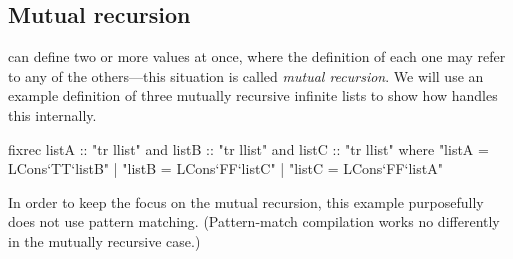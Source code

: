 \subsection{Mutual recursion}
\label{sec:fixrec-impl-mutual}

{\fixrec} can define two or more values at once, where the definition of each one may refer to any of the others---this situation is called \emph{mutual recursion}. We will use an example definition of three mutually recursive infinite lists to show how {\fixrec} handles this internally.
%
\begin{isacode}
fixrec listA :: "tr llist" and listB :: "tr llist" and listC :: "tr llist"
  where "listA = LCons`TT`listB"
  | "listB = LCons`FF`listC"
  | "listC = LCons`FF`listA"
\end{isacode}
%
In order to keep the focus on the mutual recursion, this example purposefully does not use pattern matching. (Pattern-match compilation works no differently in the mutually recursive case.)

